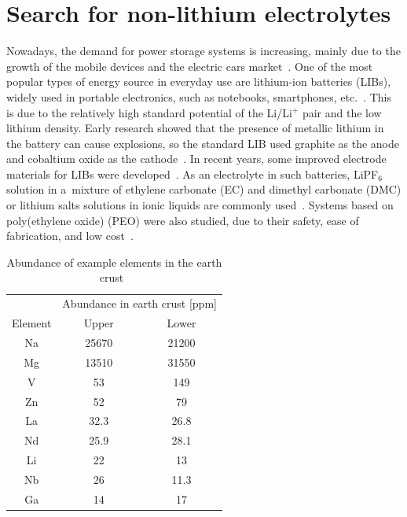 \section{Search for non-lithium electrolytes}

Nowadays, the demand for power storage systems is increasing, mainly due to the growth of the mobile devices and the electric cars market~\cite{energy-demand}. One of the most popular types of energy source in everyday use are lithium-ion batteries (LIBs), widely used in portable electronics, such as notebooks, smartphones, etc.~\cite{energy-storage}. This is due to the relatively high standard potential of the Li/Li$^{+}$ pair and the low lithium density. Early research showed that the presence of metallic lithium in the battery can cause explosions, so the standard LIB used graphite as the anode and cobaltium oxide as the cathode~\cite{lib-review}. In recent years, some improved electrode materials for LIBs were developed~\cite{lib-review-2}. As an electrolyte in such batteries, LiPF$_6$ solution in a~mixture of ethylene carbonate (EC) and dimethyl carbonate (DMC) or lithium salts solutions in ionic liquids are commonly used~\cite{lib-electrolytes}. Systems based on poly(ethylene oxide) (PEO) were also studied, due to their safety, ease of fabrication, and low cost~\cite{lib-peo-electrolytes}.

\begin{table}
    \centering
    \caption{Abundance of example elements in the earth crust~\cite{lithium-abundance}}
    \begin{tabular}{ccc}
        \toprule
         &  \multicolumn{2}{c}{Abundance in earth crust [ppm]} \\
        Element & Upper & Lower \\
        \midrule
        Na & 25670 & 21200 \\
        Mg & 13510 & 31550 \\
        V & 53 & 149 \\
        Zn & 52 & 79 \\
        La & 32.3 & 26.8 \\
        Nd & 25.9 & 28.1 \\
        Li & 22 & 13 \\
        Nb & 26 & 11.3 \\
        Ga & 14 & 17 \\
        \bottomrule
    \end{tabular}    
    \label{tab:lithium_abundance}
\end{table}

